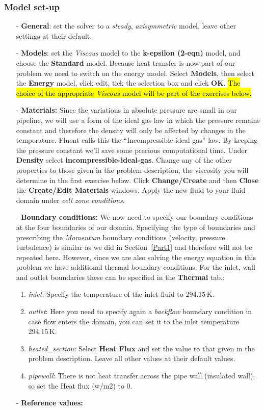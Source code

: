 \documentclass[11pt,a4paper,oneside]{scrartcl}
\newcommand\bfr[1]{\textcolor[rgb]{1,0.00,0.00}{\textbf{\textsf{#1}}}}
\begin{document}
\subsubsection*{Model set-up}

\begin{itemize}
    \item[-] \textbf{General}: set the solver to a \emph{steady}, \emph{axisymmetric} model, leave other settings at their default.
    \item[-] \textbf{Models}: set the \emph{Viscous} model to the \bfr{k-epsilon (2-eqn)} model, and choose the \bfr{Standard} model. Because heat transfer is now part of our problem we need to switch on the energy model. Select \bfr{Models}, then select the \bfr{Energy} model, click edit, tick the selection box and click \bfr{OK}. \hl{The choice of the appropriate \emph{Viscous} model will be part of the exercises below.}

    \item[-] \textbf{Materials:} Since the variations in absolute pressure are small in our pipeline, we will use a form of the ideal gas law in which the pressure remains constant and therefore the density will only be affected by changes in the temperature. Fluent calls this the ``Incompressible ideal gas'' law. By keeping the pressure constant we'll save some precious computational time. Under \bfr{Density} select \bfr{incompressible-ideal-gas}. Change any of the other properties to those given in the problem description, the viscosity you will determine in the first exercise below. Click \bfr{Change/Create} and then \bfr{Close} the \bfr{Create/Edit Materials} windows. Apply the new fluid to your fluid domain under \emph{cell zone conditions}.
    \item[-] \textbf{Boundary conditions:} We now need to specify our boundary conditions at the four boundaries of our domain. Specifying the type of boundaries and prescribing the \emph{Momentum} boundary conditions (velocity, pressure, turbulence) is similar as we did in Section~\ref{Part1} and therefore will not be repeated here. However, since we are also solving the energy equation in this problem we have additional thermal boundary conditions. For the inlet, wall and outlet boundaries these can be specified in the \bfr{Thermal} tab.:
    \begin{enumerate}
    \item \emph{inlet}: Specify the temperature of the inlet fluid to 294.15\,K.
    \item \emph{outlet}: Here you need to specify again a \emph{backflow} boundary condition in case flow enters the domain, you can set it to the inlet temperature 294.15\,K.
    \item \emph{heated\_section}: Select \bfr{Heat Flux} and set the value to that given in the problem description. Leave all other values at their default values.
    \item \emph{pipewall}: There is not heat transfer across the pipe wall (insulated wall), so set the Heat flux (w/m2) to 0.
    \end{enumerate}

    \item[-] \textbf{Reference values: }
\end{itemize}
\end{document}
